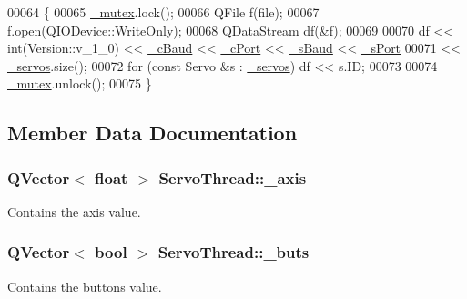 \begin{DoxyCode}
00064 \{
00065     \hyperlink{a00007_a6327eafc0dac189ec1b202d63ef32457}{\_mutex}.lock();
00066     QFile f(file);
00067     f.open(QIODevice::WriteOnly);
00068     QDataStream df(&f);
00069     
00070     df << int(Version::v\_1\_0) << \hyperlink{a00007_a9fccfd415e2e55c8abef7fcc6535af30}{\_cBaud} << \hyperlink{a00007_ab52437b31a433c427a6c050f2b1cc959}{\_cPort} << \hyperlink{a00007_a5b9a41b9e271275b914affb0a845a2ee}{\_sBaud} << 
      \hyperlink{a00007_ac9a614aa1518efb49b0a06636bd1bdbf}{\_sPort}
00071        << \hyperlink{a00007_a1ac6662fe6d198b5971ae0ffa7ddfcfd}{\_servos}.size();    
00072     \textcolor{keywordflow}{for} (\textcolor{keyword}{const} Servo &s : \hyperlink{a00007_a1ac6662fe6d198b5971ae0ffa7ddfcfd}{\_servos}) df << s.ID;
00073     
00074     \hyperlink{a00007_a6327eafc0dac189ec1b202d63ef32457}{\_mutex}.unlock();
00075 \}
\end{DoxyCode}


\subsection{Member Data Documentation}
\hypertarget{a00007_aad24ef961ee39dd35766c725c13b11b7}{}
\subsubsection[{\+\_\+axis}]{\setlength{\rightskip}{0pt plus 5cm}Q\+Vector$<$ float $>$ Servo\+Thread\+::\+\_\+axis\hspace{0.3cm}{\ttfamily [private]}}\label{a00007_aad24ef961ee39dd35766c725c13b11b7}


Contains the axis value. 

\hypertarget{a00007_a6f956f7e0f2953e213ff95fb64857ab0}{}
\subsubsection[{\+\_\+buts}]{\setlength{\rightskip}{0pt plus 5cm}Q\+Vector$<$ bool $>$ Servo\+Thread\+::\+\_\+buts\hspace{0.3cm}{\ttfamily [private]}}\label{a00007_a6f956f7e0f2953e213ff95fb64857ab0}


Contains the buttons value. 

\hypertarget{a00007_a9fccfd415e2e55c8abef7fcc6535af30}{}
